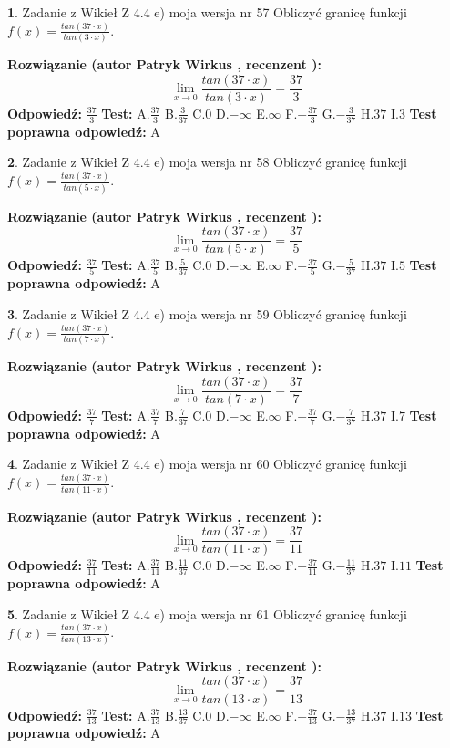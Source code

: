 \documentclass[12pt, a4paper]{article}
\theoremstyle{definition} %
\newtheorem{zad}{}
\newcommand{\zadStart}[1]{\begin{zad}#1\newline}
\newcommand{\zadStop}{\end{zad}}
\newcommand{\rozwStart}[2]{\noindent \textbf{Rozwiązanie (autor #1 , recenzent #2): }\newline}
\newcommand{\rozwStop}{\newline}
\newcommand{\odpStart}{\noindent \textbf{Odpowiedź:}\newline}
\newcommand{\odpStop}{\newline}
\newcommand{\testStart}{\noindent \textbf{Test:}\newline}
\newcommand{\testStop}{\newline}
\newcommand{\kluczStart}{\noindent \textbf{Test poprawna odpowiedź:}\newline}
\newcommand{\kluczStop}{\newline}
\begin{document}
\zadStart{Zadanie z Wikieł Z 4.4 e) moja wersja nr 57}
Obliczyć granicę funkcji $f(x)=\frac{tan(37\cdot x)}{tan(3\cdot x)}$.
\zadStop
\rozwStart{Patryk Wirkus}{}
$$\lim\limits_{x\to 0}\frac{tan(37\cdot x)}{tan(3\cdot x)}=
\frac{37}{3}$$
\rozwStop
\odpStart
$\frac{37}{3}$
\odpStop
\testStart
A.$\frac{37}{3}$
B.$\frac{3}{37}$
C.$0$
D.$-\infty$
E.$\infty$
F.$-\frac{37}{3}$
G.$-\frac{3}{37}$
H.$37$
I.$3$
\testStop
\kluczStart
A
\kluczStop



\zadStart{Zadanie z Wikieł Z 4.4 e) moja wersja nr 58}
Obliczyć granicę funkcji $f(x)=\frac{tan(37\cdot x)}{tan(5\cdot x)}$.
\zadStop
\rozwStart{Patryk Wirkus}{}
$$\lim\limits_{x\to 0}\frac{tan(37\cdot x)}{tan(5\cdot x)}=
\frac{37}{5}$$
\rozwStop
\odpStart
$\frac{37}{5}$
\odpStop
\testStart
A.$\frac{37}{5}$
B.$\frac{5}{37}$
C.$0$
D.$-\infty$
E.$\infty$
F.$-\frac{37}{5}$
G.$-\frac{5}{37}$
H.$37$
I.$5$
\testStop
\kluczStart
A
\kluczStop



\zadStart{Zadanie z Wikieł Z 4.4 e) moja wersja nr 59}
Obliczyć granicę funkcji $f(x)=\frac{tan(37\cdot x)}{tan(7\cdot x)}$.
\zadStop
\rozwStart{Patryk Wirkus}{}
$$\lim\limits_{x\to 0}\frac{tan(37\cdot x)}{tan(7\cdot x)}=
\frac{37}{7}$$
\rozwStop
\odpStart
$\frac{37}{7}$
\odpStop
\testStart
A.$\frac{37}{7}$
B.$\frac{7}{37}$
C.$0$
D.$-\infty$
E.$\infty$
F.$-\frac{37}{7}$
G.$-\frac{7}{37}$
H.$37$
I.$7$
\testStop
\kluczStart
A
\kluczStop



\zadStart{Zadanie z Wikieł Z 4.4 e) moja wersja nr 60}
Obliczyć granicę funkcji $f(x)=\frac{tan(37\cdot x)}{tan(11\cdot x)}$.
\zadStop
\rozwStart{Patryk Wirkus}{}
$$\lim\limits_{x\to 0}\frac{tan(37\cdot x)}{tan(11\cdot x)}=
\frac{37}{11}$$
\rozwStop
\odpStart
$\frac{37}{11}$
\odpStop
\testStart
A.$\frac{37}{11}$
B.$\frac{11}{37}$
C.$0$
D.$-\infty$
E.$\infty$
F.$-\frac{37}{11}$
G.$-\frac{11}{37}$
H.$37$
I.$11$
\testStop
\kluczStart
A
\kluczStop



\zadStart{Zadanie z Wikieł Z 4.4 e) moja wersja nr 61}
Obliczyć granicę funkcji $f(x)=\frac{tan(37\cdot x)}{tan(13\cdot x)}$.
\zadStop
\rozwStart{Patryk Wirkus}{}
$$\lim\limits_{x\to 0}\frac{tan(37\cdot x)}{tan(13\cdot x)}=
\frac{37}{13}$$
\rozwStop
\odpStart
$\frac{37}{13}$
\odpStop
\testStart
A.$\frac{37}{13}$
B.$\frac{13}{37}$
C.$0$
D.$-\infty$
E.$\infty$
F.$-\frac{37}{13}$
G.$-\frac{13}{37}$
H.$37$
I.$13$
\testStop
\kluczStart
A
\kluczStop
\end{document}

